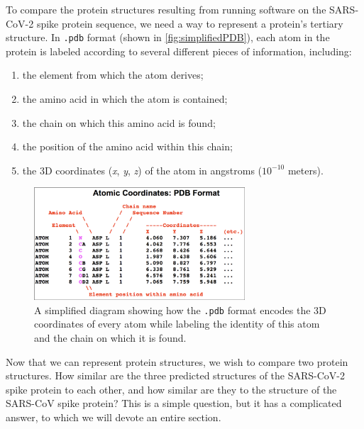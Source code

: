 To compare the protein structures resulting from running software on the SARS-CoV-2 spike protein sequence, we need a way to represent a protein's tertiary structure. In \texttt{.pdb} format (shown in \autoref{fig:simplifiedPDB}), each atom in the protein is labeled according to several different pieces of information, including:

\begin{enumerate}
	\item the element from which the atom derives;
	\item the amino acid in which the atom is contained;
	\item the chain on which this amino acid is found;
	\item the position of the amino acid within this chain;
	\item the 3D coordinates (\textit{x}, \textit{y}, \textit{z}) of the atom in angstroms ($10^{-10}$ meters).
\end{enumerate}

\begin{figure}[h]
	\centering
	\mySfFamily
	\includegraphics[width = 0.7\textwidth]{../images/simplifiedPDB.png}
	\caption{A simplified diagram showing how the \texttt{.pdb} format encodes the 3D coordinates of every atom while labeling the identity of this atom and the chain on which it is found.}
	\label{fig:simplifiedPDB}
\end{figure}

\begin{note}\end{note}

Now that we can represent protein structures, we wish to compare two protein structures. How similar are the three predicted structures of the SARS-CoV-2 spike protein to each other, and how similar are they to the structure of the SARS-CoV spike protein? This is a simple question, but it has a complicated answer, to which we will devote an entire section.\\

